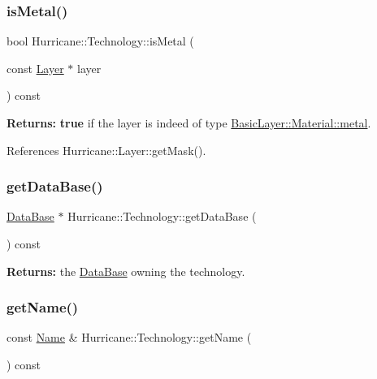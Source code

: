 \subsubsection{\texorpdfstring{is\+Metal()}{isMetal()}}
{\footnotesize\ttfamily bool Hurricane\+::\+Technology\+::is\+Metal (\begin{DoxyParamCaption}\item[{const \mbox{\hyperlink{classHurricane_1_1Layer}{Layer}} $\ast$}]{layer }\end{DoxyParamCaption}) const\hspace{0.3cm}{\ttfamily [inline]}}

{\bfseries Returns\+:} {\bfseries true} if the {\ttfamily layer} is indeed of type \mbox{\hyperlink{classHurricane_1_1BasicLayer_1_1Material_a3e815440ad4b86b3569fa54ca06fc3e8a9f5ac52339b7bd9bbf7cdac468c51924}{Basic\+Layer\+::\+Material\+::metal}}. 

References Hurricane\+::\+Layer\+::get\+Mask().

\mbox{\label{classHurricane_1_1Technology_acf836e738fba14fa493b0e08148cc3ee}} 
\subsubsection{\texorpdfstring{get\+Data\+Base()}{getDataBase()}}
{\footnotesize\ttfamily \mbox{\hyperlink{classHurricane_1_1DataBase}{Data\+Base}} $\ast$ Hurricane\+::\+Technology\+::get\+Data\+Base (\begin{DoxyParamCaption}{ }\end{DoxyParamCaption}) const\hspace{0.3cm}{\ttfamily [inline]}}

{\bfseries Returns\+:} the \mbox{\hyperlink{classHurricane_1_1DataBase}{Data\+Base}} owning the technology. \mbox{\label{classHurricane_1_1Technology_ae466071aa1991c853ee71af12fa62d4e}} 
\subsubsection{\texorpdfstring{get\+Name()}{getName()}}
{\footnotesize\ttfamily const \mbox{\hyperlink{classHurricane_1_1Name}{Name}} \& Hurricane\+::\+Technology\+::get\+Name (\begin{DoxyParamCaption}{ }\end{DoxyParamCaption}) const\hspace{0.3cm}{\ttfamily [inline]}}

